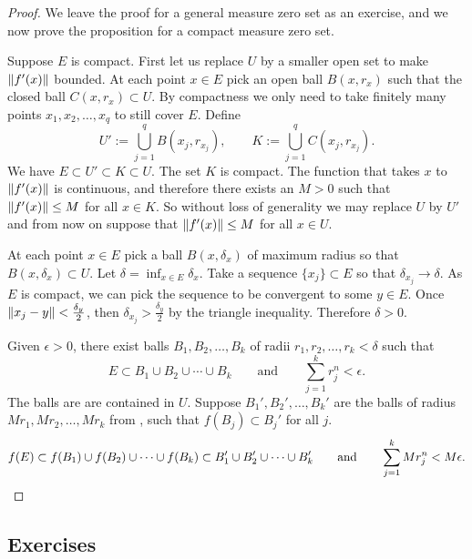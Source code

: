 \begin{proof}
We leave the proof for a general measure zero set as an exercise, and we
now prove the proposition for a compact measure zero set.

Suppose $E$ is compact.
First let us replace $U$ by a smaller open set to make $\lVert {f'(x)} \rVert$ bounded.
At each point $x \in
E$ pick an open ball $B(x,r_x)$ such that the closed ball $C(x,r_x) \subset
U$.  By compactness we only need to take finitely
many points $x_1,x_2,\ldots,x_q$ to still cover $E$.  Define
\begin{equation*}
U' := \bigcup_{j=1}^q B(x_j,r_{x_j}), \qquad
K := \bigcup_{j=1}^q C(x_j,r_{x_j}).
\end{equation*}
We have $E \subset U' \subset K \subset U$.  The set $K$ is compact.
The function that takes $x$ to $\lVert {f'(x)} \rVert$ is continuous, and therefore
there exists an $M > 0$ such that $\lVert {f'(x)} \rVert \leq M$ for all $x \in K$.
So without loss of generality we may replace $U$ by $U'$ and from now on
suppose that $\lVert {f'(x)} \rVert \leq M$ for all $x \in U$.

At each point $x \in E$ pick a ball $B(x,\delta_x)$ of maximum radius 
so that $B(x,\delta_x) \subset U$.  Let $\delta = \inf_{x\in E} \delta_x$.
Take a sequence $\{ x_j \} \subset E$ so that $\delta_{x_j} \to \delta$.
As $E$ is compact, we can pick the sequence to be convergent to some $y \in
E$.  Once $\lVert {x_j-y} \rVert < \frac{\delta_y}{2}$, then
$\delta_{x_j} > \frac{\delta_y}{2}$ by the triangle inequality.
Therefore $\delta > 0$.

Given $\epsilon > 0$, there exist balls $B_1,B_2,\ldots,B_k$ of radii
$r_1,r_2,\ldots,r_k < \delta$ such that
\begin{equation*}
E \subset B_1 \cup B_2 \cup \cdots \cup B_k
\qquad \text{and} \qquad
\sum_{j=1}^k r_j^n < \epsilon.
\end{equation*}
The balls are are contained in $U$.
Suppose $B_1', B_2', \ldots, B_k'$ are the balls of radius
$Mr_1, Mr_2, \ldots, Mr_k$ from
, such that $f(B_j) \subset B_j'$ for all $j$.
\begin{equation*}
f(E) \subset f(B_1) \cup f(B_2) \cup \cdots \cup f(B_k)
\subset B_1' \cup B_2' \cup \cdots \cup B_k'
\qquad \text{and} \qquad
\sum_{j=1}^k Mr_j^n
 < M \epsilon. \qedhere
\end{equation*}
\end{proof}

\subsection{Exercises}

